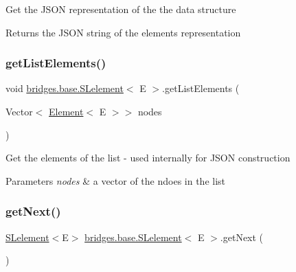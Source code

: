 Get the J\+S\+ON representation of the the data structure

\begin{DoxyReturn}{Returns}
the J\+S\+ON string of the element\textquotesingle{}s representation 
\end{DoxyReturn}
\mbox{\label{classbridges_1_1base_1_1_s_lelement_abadffea339171349a8e86ded9cd3fe21}} 
\subsubsection{\texorpdfstring{get\+List\+Elements()}{getListElements()}}
{\footnotesize\ttfamily void \hyperlink{classbridges_1_1base_1_1_s_lelement}{bridges.\+base.\+S\+Lelement}$<$ E $>$.get\+List\+Elements (\begin{DoxyParamCaption}\item[{Vector$<$ \hyperlink{classbridges_1_1base_1_1_element}{Element}$<$ E $>$$>$}]{nodes }\end{DoxyParamCaption})\hspace{0.3cm}{\ttfamily [protected]}}

Get the elements of the list -\/ used internally for J\+S\+ON construction


\begin{DoxyParams}{Parameters}
{\em nodes} & a vector of the ndoes in the list \\
\hline
\end{DoxyParams}
\mbox{\label{classbridges_1_1base_1_1_s_lelement_a060c4671e05e3f20b16630343393b80d}} 
\subsubsection{\texorpdfstring{get\+Next()}{getNext()}}
{\footnotesize\ttfamily \hyperlink{classbridges_1_1base_1_1_s_lelement}{S\+Lelement}$<$E$>$ \hyperlink{classbridges_1_1base_1_1_s_lelement}{bridges.\+base.\+S\+Lelement}$<$ E $>$.get\+Next (\begin{DoxyParamCaption}{ }\end{DoxyParamCaption})}

